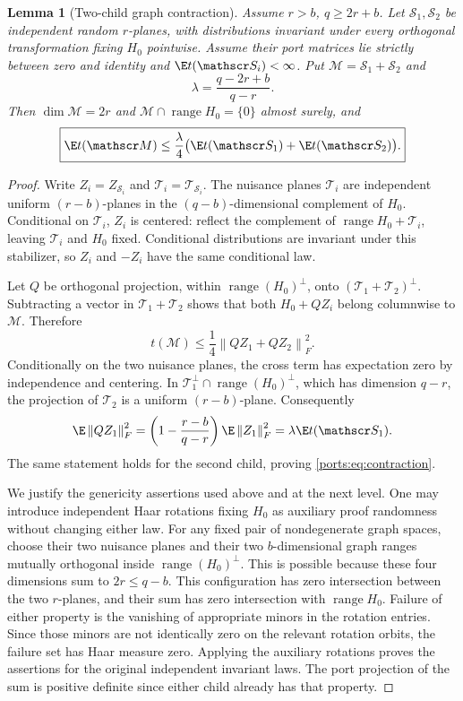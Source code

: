 \documentclass[11pt,oneside,openany,a4paper]{book}
\numberwithin{equation}{chapter}
\newtheorem{lemma}[theorem]{Lemma}
\theoremstyle{definition}
\theoremstyle{remark}
\newcommand{\F}[1]{\left\lVert#1\right\rVert_F}
\DeclareMathOperator{\ran}{range}\DeclareMathOperator{\OPT}{OPT}
\begin{document}
\begin{lemma}[Two-child graph contraction]\label{ports:lem:graph}
Assume $r>b$, $q\ge2r+b$. Let $\mathscr S_1,\mathscr S_2$ be independent random $r$-planes, with distributions invariant under every orthogonal transformation fixing $H_0$ pointwise. Assume their port matrices lie strictly between zero and identity and $\E t(\mathscr S_i)<\infty$. Put $\mathscr M=\mathscr S_1+\mathscr S_2$ and
\[
 \lambda=\frac{q-2r+b}{q-r}.
\]
Then $\dim\mathscr M=2r$ and $\mathscr M\cap\ran H_0=\{0\}$ almost surely, and
\begin{equation}\label{ports:eq:contraction}
 \boxed{\E t(\mathscr M)\le\frac\lambda4
      \bigl(\E t(\mathscr S_1)+\E t(\mathscr S_2)\bigr).}
\end{equation}
\end{lemma}
\begin{proof}
Write $Z_i=Z_{\mathscr S_i}$ and $\mathscr T_i=\mathscr T_{\mathscr S_i}$. The nuisance planes $\mathscr T_i$ are independent uniform $(r-b)$-planes in the $(q-b)$-dimensional complement of $H_0$. Conditional on $\mathscr T_i$, $Z_i$ is centered: reflect the complement of $\ran H_0+\mathscr T_i$, leaving $\mathscr T_i$ and $H_0$ fixed. Conditional distributions are invariant under this stabilizer, so $Z_i$ and $-Z_i$ have the same conditional law.

Let $Q$ be orthogonal projection, within $\ran(H_0)^\perp$, onto $(\mathscr T_1+\mathscr T_2)^\perp$. Subtracting a vector in $\mathscr T_1+\mathscr T_2$ shows that both $H_0+QZ_i$ belong columnwise to $\mathscr M$. Therefore
\begin{equation}\label{ports:eq:candidate}
 t(\mathscr M)\le\frac14\F{QZ_1+QZ_2}^2.
\end{equation}
Conditionally on the two nuisance planes, the cross term has expectation zero by independence and centering. In $\mathscr T_1^\perp\cap\ran(H_0)^\perp$, which has dimension $q-r$, the projection of $\mathscr T_2$ is a uniform $(r-b)$-plane. Consequently
\[
 \E\F{QZ_1}^2=\left(1-\frac{r-b}{q-r}\right)\E\F{Z_1}^2
 =\lambda\E t(\mathscr S_1).
\]
The same statement holds for the second child, proving \eqref{ports:eq:contraction}.

We justify the genericity assertions used above and at the next level. One may introduce independent Haar rotations fixing $H_0$ as auxiliary proof randomness without changing either law. For any fixed pair of nondegenerate graph spaces, choose their two nuisance planes and their two $b$-dimensional graph ranges mutually orthogonal inside $\ran(H_0)^\perp$. This is possible because these four dimensions sum to $2r\le q-b$. This configuration has zero intersection between the two $r$-planes, and their sum has zero intersection with $\ran H_0$. Failure of either property is the vanishing of appropriate minors in the rotation entries. Since those minors are not identically zero on the relevant rotation orbits, the failure set has Haar measure zero. Applying the auxiliary rotations proves the assertions for the original independent invariant laws. The port projection of the sum is positive definite since either child already has that property.
\end{proof}
\end{document}
